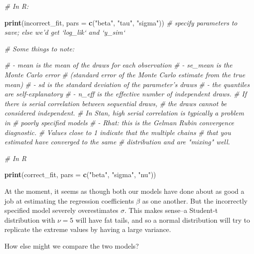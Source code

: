 \documentclass[]{book}
\newenvironment{Shaded}{\begin{snugshade}}{\end{snugshade}}
\newcommand{\KeywordTok}[1]{\textcolor[rgb]{0.13,0.29,0.53}{\textbf{{#1}}}}
\newcommand{\DataTypeTok}[1]{\textcolor[rgb]{0.13,0.29,0.53}{{#1}}}
\newcommand{\StringTok}[1]{\textcolor[rgb]{0.31,0.60,0.02}{{#1}}}
\newcommand{\CommentTok}[1]{\textcolor[rgb]{0.56,0.35,0.01}{\textit{{#1}}}}
\newcommand{\NormalTok}[1]{{#1}}
\begin{document}
\begin{Shaded}
\begin{Highlighting}[]
\CommentTok{# In R:}

\KeywordTok{print}\NormalTok{(incorrect_fit, }\DataTypeTok{pars =} \KeywordTok{c}\NormalTok{(}\StringTok{"beta"}\NormalTok{, }\StringTok{"tau"}\NormalTok{, }\StringTok{"sigma"}\NormalTok{))}
\CommentTok{# specify parameters to save; else we'd get `log_lik` and `y_sim`}

\CommentTok{# Some things to note:}

\CommentTok{# - mean is the mean of the draws for each observation}
\CommentTok{# - se_mean is the Monte Carlo error}
\CommentTok{#   (standard error of the Monte Carlo estimate from the true mean)}
\CommentTok{# - sd is the standard deviation of the parameter's draws}
\CommentTok{# - the quantiles are self-explanatory}
\CommentTok{# - n_eff is the effective number of independent draws.}
\CommentTok{#   If there is serial correlation between sequential draws,}
\CommentTok{#   the draws cannot be considered independent.}
\CommentTok{#   In Stan, high serial correlation is typically a problem in}
\CommentTok{#   poorly specified models}
\CommentTok{# - Rhat: this is the Gelman Rubin convergence diagnostic.}
\CommentTok{#   Values close to 1 indicate that the multiple chains}
\CommentTok{#   that you estimated have converged to the same}
\CommentTok{#   distribution and are "mixing" well.}
\end{Highlighting}
\end{Shaded}

\begin{Shaded}
\begin{Highlighting}[]
\CommentTok{# In R}

\KeywordTok{print}\NormalTok{(correct_fit, }\DataTypeTok{pars =} \KeywordTok{c}\NormalTok{(}\StringTok{"beta"}\NormalTok{, }\StringTok{"sigma"}\NormalTok{, }\StringTok{"nu"}\NormalTok{))}
\end{Highlighting}
\end{Shaded}

At the moment, it seems as though both our models have done about as
good a job at estimating the regression coefficients \(\beta\) as one
another. But the incorrectly specified model severely overestimates
\(\sigma\). This makes sense--a Student-t distribution with \(\nu=5\)
will have fat tails, and so a normal distribution will try to replicate
the extreme values by having a large variance.

How else might we compare the two models?
\end{document}
